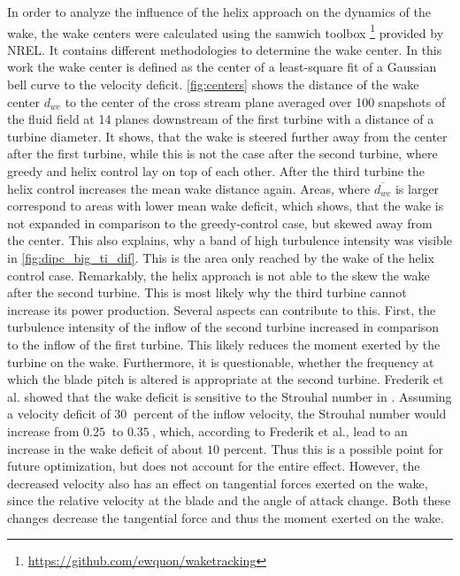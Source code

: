 In order to analyze the influence of the helix approach on the dynamics of the wake, the wake centers were calculated using the samwich toolbox \footnote{\url{https://github.com/ewquon/waketracking}} provided by NREL. It contains different methodologies to determine the wake center. In this work the wake center is defined as the center of a least-square fit of a Gaussian bell curve to the velocity deficit. \autoref{fig:centers} shows the distance of the wake center $d_{wc}$ to the center of the cross stream plane averaged over 100 snapshots of the fluid field at 14 planes downstream of the first turbine with a distance of a turbine diameter. It shows, that the wake is steered further away from the center after the first turbine, while this is not the case after the second turbine, where greedy and helix control lay on top of each other. After the third turbine the helix control increases the mean wake distance again. Areas, where $\overline{d_{wc}}$ is larger correspond to areas with lower mean wake deficit, which shows, that the wake is not expanded in comparison to the greedy-control case, but skewed away from the center. This also explains, why a band of high turbulence intensity was visible in \autoref{fig:dipc_big_ti_dif}. This is the area only reached by the wake of the helix control case. Remarkably, the helix approach is not able to the skew the wake after the second turbine. This is most likely why the third turbine cannot increase its power production. Several aspects can contribute to this. First, the turbulence intensity  of the inflow of the second turbine increased in comparison to the inflow of the first turbine. This likely reduces the moment exerted by the turbine on the wake. Furthermore, it is questionable, whether the frequency at which the blade pitch is altered is appropriate at the second turbine. Frederik et al. showed that the wake deficit is sensitive to the Strouhal number in \cite{frederik_helix_2020}. Assuming a velocity deficit of $\SI{30}{}$ percent of the inflow velocity, the Strouhal number would increase from $\SI{0.25}{}$ to $\SI{0.35}{}$, which, according to Frederik et al., lead to an increase in the wake deficit of about $10$ percent. Thus this is a possible point for future optimization, but does not account for the entire effect. However, the decreased velocity also has an effect on tangential forces exerted on the wake, since the relative velocity at the blade and the angle of attack change. Both these changes decrease the tangential force and thus the moment exerted on the wake. \\
